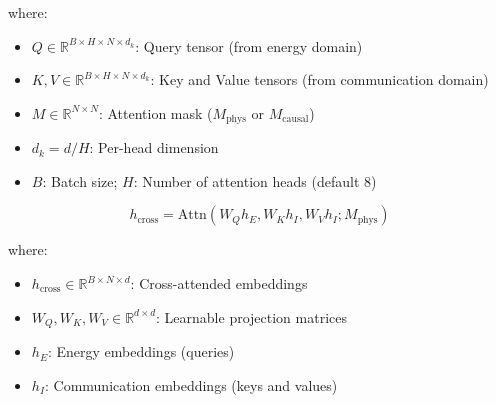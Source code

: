 \noindent where:
\begin{itemize}
    \item $Q \in \mathbb{R}^{B \times H \times N \times d_k}$: Query tensor (from energy domain)
    \item $K, V \in \mathbb{R}^{B \times H \times N \times d_k}$: Key and Value tensors (from communication domain)
    \item $M \in \mathbb{R}^{N \times N}$: Attention mask ($M_{\text{phys}}$ or $M_{\text{causal}}$)
    \item $d_k = d / H$: Per-head dimension
    \item $B$: Batch size; $H$: Number of attention heads (default 8)
\end{itemize}


\begin{equation}
\label{eq:cross_attention}
h_{\text{cross}} = \text{Attn}(W_Q h_E, W_K h_I, W_V h_I; M_{\text{phys}})
\end{equation}

\noindent where:
\begin{itemize}
    \item $h_{\text{cross}} \in \mathbb{R}^{B \times N \times d}$: Cross-attended embeddings
    \item $W_Q, W_K, W_V \in \mathbb{R}^{d \times d}$: Learnable projection matrices
    \item $h_E$: Energy embeddings (queries)
    \item $h_I$: Communication embeddings (keys and values)
\end{itemize}




